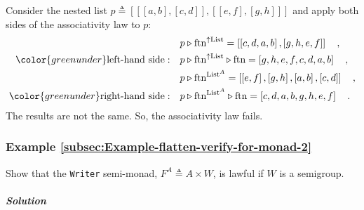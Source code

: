 Consider the nested list $p\triangleq\left[\left[\left[a,b\right],\left[c,d\right]\right],\left[\left[e,f\right],\left[g,h\right]\right]\right]$
and apply both sides of the associativity law to $p$:
\begin{align*}
 & p\triangleright\text{ftn}^{\uparrow\text{List}}=\left[\left[c,d,a,b\right],\left[g,h,e,f\right]\right]\quad,\\
{\color{greenunder}\text{left-hand side}:}\quad & p\triangleright\text{ftn}^{\uparrow\text{List}}\triangleright\text{ftn}=\left[g,h,e,f,c,d,a,b\right]\quad,\\
 & p\triangleright\text{ftn}^{\text{List}^{A}}=\left[\left[e,f\right],\left[g,h\right],\left[a,b\right],\left[c,d\right]\right]\quad,\\
{\color{greenunder}\text{right-hand side}:}\quad & p\triangleright\text{ftn}^{\text{List}^{A}}\triangleright\text{ftn}=\left[c,d,a,b,g,h,e,f\right]\quad.
\end{align*}
The results are not the same. So, the associativity law fails.

\subsubsection{Example \label{subsec:Example-flatten-verify-for-monad-2}\ref{subsec:Example-flatten-verify-for-monad-2}}

Show that the \lstinline!Writer! semi-monad, $F^{A}\triangleq A\times W$,
is lawful if $W$ is a semigroup.

\subparagraph{Solution}

